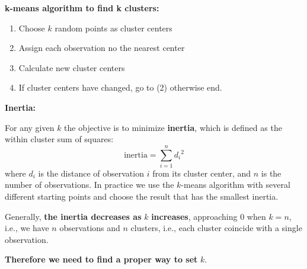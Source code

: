 \textbf{k-means algorithm to find k clusters:}
\begin{enumerate}
    \item Choose $k$ random points as cluster centers
    \item Assign each observation no the nearest center
    \item Calculate new cluster centers
    \item If cluster centers have changed, go to (2) otherwise end.
\end{enumerate}

\textbf{Inertia:}

For any given $k$ the objective is to minimize \textbf{inertia}, which is defined as the within cluster sum of squares:
\begin{equation*}
    \text{inertia} =\sum _{i=1}^{n} d{_{i}}^{2}
\end{equation*}
where $d_{i}$ is the distance of observation $i$ from its cluster center, and $n$ is the number of observations. In practice we use the $k$-means algorithm with several different starting points and choose the result that has the smallest inertia.

Generally, \textbf{the inertia decreases as }$k$\textbf{ increases}, approaching $0$ when $k=n$, i.e., we have $n$ observations and $n$ clusters, i.e., each cluster coincide with a single observation.

\textbf{Therefore we need to find a proper way to set }$k$.

